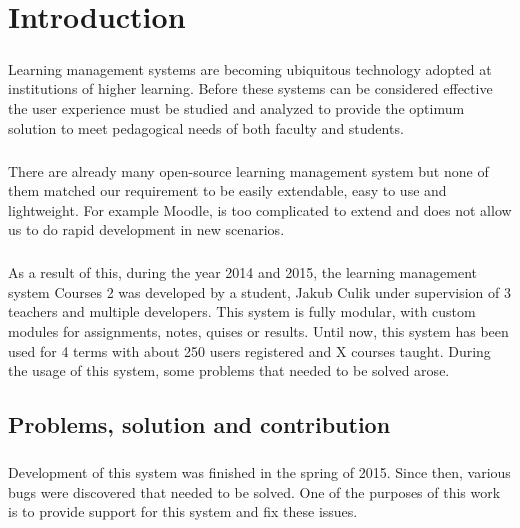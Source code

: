 \chapter*{Introduction}

\paragraph{}
Learning management systems are becoming ubiquitous technology adopted at institutions of higher learning. Before these systems can be considered effective the user experience must be studied and analyzed to provide the optimum solution to meet pedagogical needs of both faculty and students. \cite{machado2007blackboard}

\paragraph{}
There are already many open-source learning management system but none of them matched our requirement to be easily extendable, easy to use and lightweight. For example Moodle, is too complicated to extend and does not allow us to do rapid development in new scenarios.

\paragraph{}
As a result of this, during the year 2014 and 2015, the learning management system Courses 2 was developed by a student, Jakub Culik under supervision of 3 teachers and multiple developers. This system is fully modular, with custom modules for assignments, notes, quises or results. Until now, this system has been used for 4 terms with about 250 users registered and X courses taught. During the usage of this system, some problems that needed to be solved arose.

\section*{Problems, solution and contribution}

\paragraph{}
Development of this system was finished in the spring of 2015. Since then, various bugs were discovered that needed to be solved. One of the purposes of this work is to provide support for this system and fix these issues.

